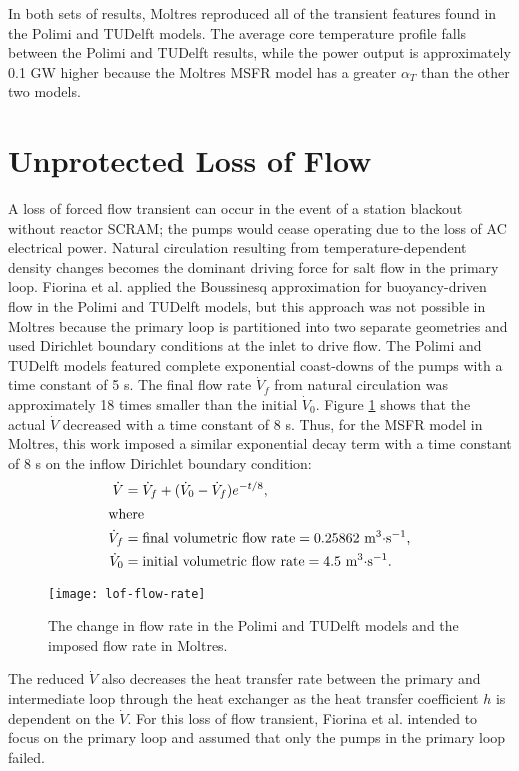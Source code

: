 In both sets of results, Moltres reproduced all of the transient features
found in the Polimi and TUDelft models. The average core temperature profile
falls between the Polimi and TUDelft results, while the power output is
approximately 0.1 GW higher because the Moltres \gls{MSFR} model has a
greater $\alpha_T$ than the other two models. 

\section{Unprotected Loss of Flow}

A loss of forced flow transient can occur in the event of a station blackout
without reactor SCRAM; the pumps would cease operating due to the loss of AC
electrical
power. Natural circulation resulting from temperature-dependent density
changes becomes the dominant driving force for salt flow in the primary loop.
Fiorina et al. \cite{fiorina_modelling_2014} applied the Boussinesq
approximation for buoyancy-driven flow in the Polimi and TUDelft models, but
this approach was not possible in Moltres because the primary loop is
partitioned into two separate geometries and used Dirichlet boundary
conditions at the inlet to drive flow. The Polimi and TUDelft
models featured complete exponential coast-downs of the pumps with a time
constant of 5 s. The final flow rate $\dot{V}_f$ from natural circulation
was approximately 18 times smaller than the initial $\dot{V}_0$. Figure
\ref{fig:flowrate} shows that the actual $\dot{V}$ decreased with a time
constant of 8 s. Thus, for the \gls{MSFR} model in Moltres, this work imposed
a similar exponential decay term with a time constant of 8 s on the inflow
Dirichlet boundary condition:
%
\begin{align}
    \dot{V} &= \dot{V}_f + (\dot{V}_0-\dot{V}_f) e^{-t/8},
    \label{eq:flowrate} \\
    \intertext{where}
    \dot{V}_f &= \text{final volumetric flow rate} = 0.25862
    \text{ m$^3\cdot$s$^{-1}$,} \nonumber \\
    \dot{V}_0 &= \text{initial volumetric flow rate} = 4.5
    \text{ m$^3\cdot$s$^{-1}$.} \nonumber
\end{align}

\begin{figure}[htbp!]
    \centering
    \texttt{[image: lof-flow-rate]}
    \caption{The change in flow rate in the Polimi and TUDelft models and the
    imposed flow rate in Moltres.}
    \label{fig:flowrate}
\end{figure}
%
The reduced $\dot{V}$ also decreases the heat transfer rate between the
primary and intermediate loop through the heat exchanger as the heat transfer
coefficient $h$ is dependent on the $\dot{V}$. For this loss of flow
transient, Fiorina et al. \cite{fiorina_modelling_2014} intended to focus
on the primary loop and assumed that only the pumps in the primary loop
failed.

